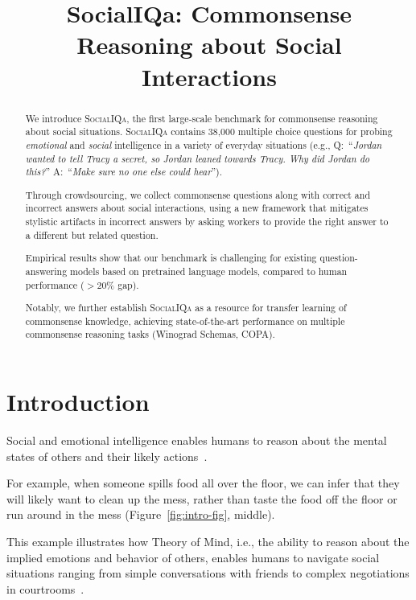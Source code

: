 \title{SocialIQa: Commonsense Reasoning about Social Interactions}

\begin{abstract}
We introduce \textsc{SocialIQa}, the first large-scale benchmark for commonsense reasoning about social situations.
    \textsc{SocialIQa} contains 38,000 multiple choice questions for probing \textit{emotional} and \textit{social} intelligence in a variety of everyday situations (e.g., 
    Q:~``\textit{Jordan wanted to tell Tracy a secret, so Jordan leaned towards Tracy. Why did Jordan do this?}'' A:~``\textit{Make sure no one else could hear}'').

    Through crowdsourcing, we collect commonsense questions along with correct and incorrect answers about social interactions, using a new framework that mitigates stylistic artifacts in incorrect answers by asking workers to provide the right answer to a different but related question.

    Empirical results show that our benchmark is challenging for existing question-answering models based on pretrained language models, compared to human performance ($>$20\% gap).

    Notably, we further establish \textsc{SocialIQa} as a resource for transfer learning of commonsense knowledge, achieving state-of-the-art performance on multiple commonsense reasoning tasks (Winograd Schemas, COPA).

    \let\thefootnote\relax{}
\end{abstract}

\section{Introduction}

Social and emotional intelligence enables humans to reason about the mental states of others and their likely actions~\cite{ganaie2015study}. 

For example, when someone spills food all over the floor, we can infer that they will likely want to clean up the mess, rather than taste the food off the floor or run around in the mess (Figure~\ref{fig:intro-fig}, middle). 

This example illustrates how Theory of Mind, i.e., the ability to reason about the implied emotions and behavior of others, enables humans to navigate social situations ranging from simple conversations with friends to complex negotiations in courtrooms~\cite{apperly2010mindreaders}.

